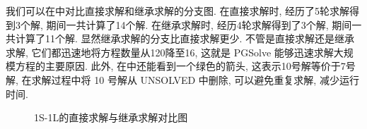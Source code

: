 我们可以在中对比直接求解和继承求解的分支图. 在直接求解时, 经历了5轮求解得到3个解, 期间一共计算了14个解. 在继承求解时, 经历4轮求解得到了3个解, 期间一共计算了11个解. 显然继承求解的分支比直接求解更少. 不管是直接求解还是继承求解, 它们都迅速地将方程数量从120降至16, 这就是 PGSolve 能够迅速求解大规模方程的主要原因. 此外, 在中还能看到一个绿色的箭头, 这表示10号解等价于7号解, 在求解过程中将 10 号解从 UNSOLVED 中删除, 可以避免重复求解, 减少运行时间. 

\begin{figure}[htbp]
\centering
{}
\hfill
{}
\caption{1S-1L的直接求解与继承求解对比图} \label{sb1}
\end{figure}

